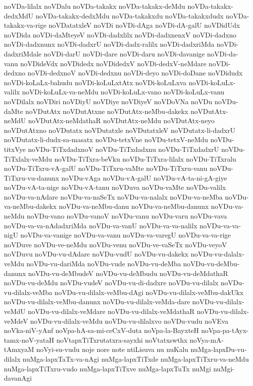 {noVDa-lilalx
noVDalu
noVDa-takakx
noVDa-takakx-deMdu
noVDa-takakx-dedxMdU
noVDa-takakx-dedxMdu
noVDa-takakxdu
noVDa-takakxdudx
noVDa-takakx-va-rige
noVDatatxleV
noVDi
noVDi-dAga
noVDi-dA-galU
noVDidUdx
noVDida
noVDi-daMteyeV
noVDi-dadxlilx
noVDi-dadxnenxV
noVDi-dadxno
noVDi-dadxnunx
noVDi-dadxrU
noVDi-dadx-ralilx
noVDi-dadxriMda
noVDi-dadxriMdale
noVDi-darU
noVDi-dare
noVDi-daru
noVDi-davanige
noVDi-da-vanu
noVDideVdx
noVDidedx
noVDidedxV
noVDi-dedxV-neMdare
noVDi-dedxno
noVDi-dedxnoV
noVDi-dedxnu
noVDi-deyo
noVDi-doDane
noVDidudx
noVDi-koLaLx-bahudu
noVDi-koLuLxtAtx
noVDi-koLuLxva
noVDi-koLuLx-valilx
noVDi-koLuLx-va-neMdu
noVDi-koLuLx-vano
noVDi-koLuLx-vanu
noVDilalx
noVDiri
noVDiyU
noVDiye
noVDiyeV
noVDoVNa
noVDu
noVDu-daMte
noVDutAtx
noVDutAtxne
noVDutAtx-neMbu-dakekx
noVDutAtx-neMdU
noVDutAtx-neMdathaR
noVDutAtx-neMdu
noVDutAtx-neyo
noVDutAtxno
noVDutatx
noVDutatxle
noVDutatxleV
noVDutatx-li-dadxrU
noVDutatx-li-dudx-sa-masatx
noVDu-tetxVne
noVDu-tetxV-neMdu
noVDu-titxVye
noVDu-TiTxdadxnoV
noVDu-TiTxdadxnu
noVDu-TiTxdadxrU
noVDu-TiTxlalx-veMdu
noVDu-TiTxra-beVku
noVDu-TiTxra-lilalx
noVDu-TiTxralu
noVDu-TiTxru-vA-galU
noVDu-TiTxru-vaMte
noVDu-TiTxru-vanu
noVDu-TiTxru-vu-danunx
noVDu-vAga
noVDu-vA-galU
noVDu-vA-ta-ni-gA-giye
noVDu-vA-ta-nige
noVDu-vA-tanu
noVDuva
noVDu-vaMte
noVDu-valilx
noVDu-va-nAdare
noVDu-va-naSeTx
noVDu-va-nalalx
noVDu-va-neMba
noVDu-va-neMbu-dakekx
noVDu-va-neMbu-danu
noVDu-va-neMbu-danunx
noVDu-va-neMdu
noVDu-vano
noVDu-vanoV
noVDu-vanu
noVDu-varu
noVDu-vava
noVDu-va-va-nAdadxriMda
noVDu-va-vanU
noVDu-va-va-nalilx
noVDu-va-va-nigU
noVDu-va-vanige
noVDu-va-vanu
noVDu-va-varegU
noVDu-va-va-rige
noVDuve
noVDu-ve-neMdu
noVDu-venu
noVDu-ve-vaSeTx
noVDu-veyoV
noVDuvu
noVDu-vu-dAdare
noVDu-vudU
noVDu-vu-dakekx
noVDu-vu-dalalx-veMdu
noVDu-vu-dariMda
noVDu-vude
noVDu-vu-deMba
noVDu-vu-deMbu-danunx
noVDu-vu-deMbudeV
noVDu-vu-deMbudu
noVDu-vu-deMdathaR
noVDu-vu-deMdu
noVDu-vudeV
noVDu-vu-di-dadxre
noVDu-vu-dilalx
noVDu-vu-dilalx-veMba
noVDu-vu-dilalx-veMbu-dAgi
noVDu-vu-dilalx-veMbu-dakUkx
noVDu-vu-dilalx-veMbu-danunx
noVDu-vu-dilalx-veMda-dare
noVDu-vu-dilalx-veMdU
noVDu-vu-dilalx-veMdare
noVDu-vu-dilalx-veMdathaR
noVDu-vu-dilalx-veMdeV
noVDu-vu-dilalx-veMdu
noVDu-vu-dilalxvo
noVDu-vudu
noVEva
noVka-niV-yAnf
noVpa-hA-sa-mi-ceCxV-duta
noVpa-la-BayxteH
noVpa-pa-tAyx-tamx-noV-yataH
noVtapxTiTxrutatxra-sayxhi
noVtatxswthx
noVya-mA-tAmxyaM
noVyi-su-vudu
noje
nore
note
ntiLisuva
nu
nuKalu
nuMga-lapxDu-vu-dilalx
nuMga-lapxTaTx-va-nAgi
nuMga-lapxTiTxde
nuMga-lapxTiTxru-va-neMdu
nuMga-lapxTiTxru-vudo
nuMga-lapxTiTxve
nuMga-lapxTuTx
nuMgi
nuMgi-davanAgi
}

